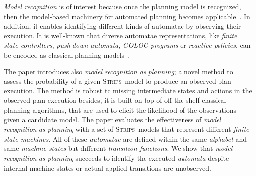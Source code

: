 \documentclass[letterpaper]{article} %
\newcommand{\strips}{\textsc{Strips}}     %
\begin{document}
{\em Model recognition} is of interest because once the planning model is recognized, then the model-based machinery for automated planning becomes applicable~\cite{ghallab2004automated}. In addition, it enables identifying different kinds of automatae by observing their execution. It is well-known that diverse automatae representations, like {\em finite state controllers}, {\em push-down automata}, {\em {\sc GOLOG} programs} or {\em reactive policies}, can be encoded as classical planning models~\cite{baier2007exploiting,Geffner:FSM:AAAI10,segovia2017generating,ivankovic2015optimal}.

The paper introduces also {\em model recognition as planning}; a novel method to assess the probability of a given \strips\ model to produce an observed plan execution. The method is robust to missing intermediate states and actions in the observed plan execution besides, it is built on top of off-the-shelf classical planning algorithms, that are used to elicit the likelihood of the observations given a candidate model. The paper evaluates the effectiveness of {\em model recognition as planning} with a set of \strips\ models that represent different {\em finite state machines}. All of these {\em automatae} are defined within the same {\em alphabet} and same {\em machine states} but different {\em transition functions}. We show that {\em model recognition as planning} succeeds to identify the executed {\em automata} despite internal machine states or actual applied transitions are unobserved.
\end{document}
